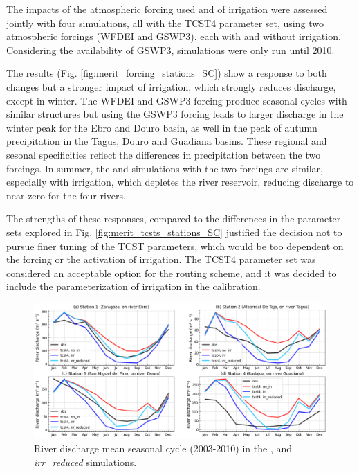 The impacts of the atmospheric forcing used and of irrigation were assessed jointly with four simulations, all with the TCST4 parameter set, using two atmospheric forcings (WFDEI and GSWP3), each with and without irrigation. Considering the availability of GSWP3, simulations were only run until 2010.

The results (Fig. \ref{fig:merit_forcing_stations_SC}) show a response to both changes but a stronger impact of irrigation, which strongly reduces discharge, except in winter. The WFDEI and GSWP3 forcing produce seasonal cycles with similar structures but using the GSWP3 forcing leads to larger discharge in the winter peak for the Ebro and Douro basin, as well in the peak of autumn precipitation in the Tagus, Douro and Guadiana basins. These regional and sesonal specificities reflect the differences in precipitation between the two forcings. %
In summer, the \noirr and \irr simulations with the two forcings are similar, especially with irrigation, which depletes the river reservoir, reducing discharge to near-zero for the four rivers.

The strengths of these responses, compared to the differences in the parameter sets explored in Fig. \ref{fig:merit_tcsts_stations_SC} justified the decision not to pursue finer tuning of the TCST parameters, which would be too dependent on the forcing or the activation of irrigation. The TCST4 parameter set was considered an acceptable option for the routing scheme, and it was decided to include the parameterization of irrigation in the calibration. 

\begin{figure}[htbp]
    \centering
    \includegraphics[width=\textwidth]{images/chap3/river_discharge/merit_irr_4stations_SC.png}
    \caption{River discharge mean seasonal cycle (2003-2010) in the \noirr, \irr and \textit{irr\_reduced} simulations.}
    \label{fig:merit_irr_stations_SC}
\end{figure}

